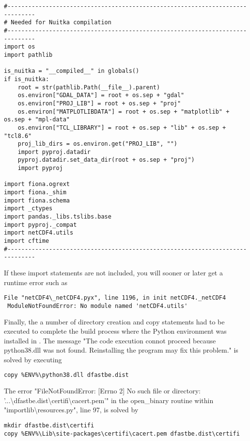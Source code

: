 \begin{Verbatim}
#------------------------------------------------------------------------------
# Needed for Nuitka compilation
#------------------------------------------------------------------------------
import os
import pathlib

is_nuitka = "__compiled__" in globals()
if is_nuitka:
    root = str(pathlib.Path(__file__).parent)
    os.environ["GDAL_DATA"] = root + os.sep + "gdal"
    os.environ["PROJ_LIB"] = root + os.sep + "proj"
    os.environ["MATPLOTLIBDATA"] = root + os.sep + "matplotlib" + os.sep + "mpl-data"
    os.environ["TCL_LIBRARY"] = root + os.sep + "lib" + os.sep + "tcl8.6"
    proj_lib_dirs = os.environ.get("PROJ_LIB", "")
    import pyproj.datadir
    pyproj.datadir.set_data_dir(root + os.sep + "proj")
    import pyproj

import fiona.ogrext
import fiona._shim
import fiona.schema
import _ctypes
import pandas._libs.tslibs.base
import pyproj._compat
import netCDF4.utils
import cftime
#------------------------------------------------------------------------------
\end{Verbatim}

If these import statements are not included, you will sooner or later get a runtime error such as

\begin{Verbatim}
File "netCDF4\_netCDF4.pyx", line 1196, in init netCDF4._netCDF4
 ModuleNotFoundError: No module named 'netCDF4.utils'
\end{Verbatim}

Finally, the a number of directory creation and copy statements had to be executed to complete the build process where the Python environment was installed in .
The message "The code execution connot proceed because python38.dll was not found. Reinstalling the program may fix this problem." is solved by executing

\begin{Verbatim}
copy %ENV%\python38.dll dfastbe.dist
\end{Verbatim}

The error "FileNotFoundError: [Errno 2] No such file or directory: '...\textbackslash{}dfastbe.dist\textbackslash{}certifi\textbackslash{}cacert.pem'" in the open\_binary routine within "importlib\textbackslash{}resources.py", line 97, is solved by

\begin{Verbatim}
mkdir dfastbe.dist\certifi
copy %ENV%\Lib\site-packages\certifi\cacert.pem dfastbe.dist\certifi
\end{Verbatim}

